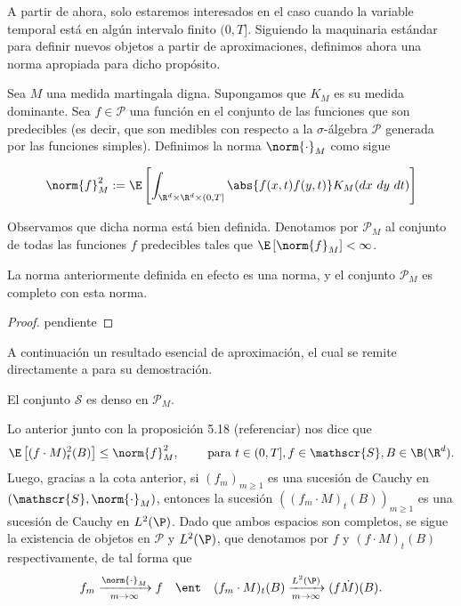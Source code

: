 A partir de ahora, solo estaremos interesados en el caso cuando la variable temporal está en algún intervalo finito $(0,T]$. Siguiendo la maquinaria estándar para definir nuevos objetos a partir de aproximaciones, definimos ahora una norma apropiada para dicho propósito.

\begin{dfn} 
Sea $M$ una medida martingala digna. Supongamos que $K_M$ es su medida dominante. Sea $f\in \mathscr{P}$ una función en el conjunto de las funciones que son predecibles (es decir, que son medibles con respecto a la $\sigma$-álgebra $\mathscr{P}$ generada por las funciones simples). Definimos la norma $\norm{\cdot}_M$ como sigue 

\end{dfn}
\[
   \norm{f}_M^2:=\E\left[\int_{\R^{d}\times\R^{d}\times (0,T]} \abs{f(x,t)f(y,t)}K_M(dx \ dy \ dt)\right]
\]

Observamos que dicha norma está bien definida. Denotamos por $\mathscr{P}_M$ al conjunto de todas las funciones $f$ predecibles tales que $\E\left[\norm{f}_M\right]<\infty$.

\begin{prop} 
La norma anteriormente definida en efecto es una norma, y el conjunto $\mathscr{P}_M$ es completo con esta norma.
\end{prop}
\begin{proof} 
  pendiente 
 \end{proof}
A continuación un resultado esencial de aproximación, el cual se remite directamente a \cite{Walsh_J.B_Introduction_to_SPDEs} para su demostración.

\begin{teo} 
El conjunto $\mathscr{S}$ es denso en $\mathscr{P}_M$.
\end{teo}
Lo anterior junto con la proposición 5.18 (referenciar) nos dice que 
\[
\E\left[(f\cdot M)_t^{2}(B)\right]\leq \norm{f}_M^2,\qquad \text{ para } t\in (0,T], f\in \mathscr{S}, B\in \B(\R^d).
\]
Luego, gracias a la cota anterior, si $(f_m)_{m\geq1}$ es una sucesión de Cauchy en $(\mathscr{S},\norm{\cdot}_M)$, entonces la sucesión $\left((f_m\cdot M)_t(B)\right)_{m\geq1}$ es una sucesión de Cauchy en $L^{2}(\P)$. Dado que ambos espacios son completos, se sigue la existencia de objetos en $\mathscr{P}$ y $L^{2}(\P)$, que denotamos por $f$ y $(f\cdot M)_t(B)$ respectivamente, de tal forma que 
\[
f_m\xrightarrow[m\to\infty]{\norm{\cdot}_M}f \quad \ent \quad (f_m\cdot M)_t(B) \xrightarrow[m\to\infty]{L^{2}(\P)} (f\dot M)(B).   
\]

